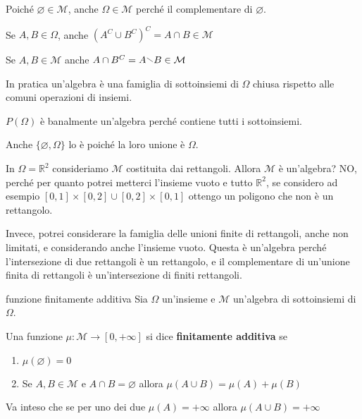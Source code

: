 \begin{remark}
    Poiché \(\varnothing \in \mathcal{M}\), anche \(\Omega \in \mathcal{M}\)
    perché il complementare di \(\varnothing\).
\end{remark}

\begin{remark}
Se \(A, B \in \Omega\), anche \({(A^{C} \cup B^{C})}^{C} = A \cap B \in
\mathcal{M}\) 
\end{remark}

\begin{remark}
    Se \(A, B \in \mathcal{M}\) anche \(A \cap B^{C} = A
    \sminus B \in
    \mathcal{M}\) 
\end{remark}

In pratica un'algebra è una famiglia di sottoinsiemi di \(\Omega\) chiusa
rispetto alle comuni operazioni di insiemi.

\begin{example}
    \(P(\Omega)\) è banalmente un'algebra perché contiene tutti i sottoinsiemi.

    Anche \(\{\varnothing, \Omega\}\) lo è poiché la loro unione è \(\Omega\).
\end{example}

\begin{example}
    In \(\Omega = \mathbb{R}^2\) consideriamo \(\mathcal{M}\) costituita dai
    rettangoli. Allora \(\mathcal{M}\) è un'algebra? NO, perché per quanto
    potrei metterci l'insieme vuoto e tutto \(\mathbb{R}^2\), se considero ad
    esempio \([0, 1] \times [0, 2] \cup [0, 2] \times [0, 1]\) ottengo un
    poligono che non è un rettangolo.

    Invece, potrei considerare la famiglia delle unioni finite di rettangoli,
    anche non limitati, e considerando anche l'insieme vuoto.
    Questa è un'algebra perché l'intersezione di due rettangoli è un rettangolo,
    e il complementare di un'unione finita di rettangoli è un'intersezione di
    finiti rettangoli.
\end{example}

\begin{definition}{funzione finitamente additiva}
     Sia \(\Omega\) un'insieme e \(\mathcal{M}\) un'algebra di sottoinsiemi di
     \(\Omega\).

     Una funzione \(\mu : \mathcal{M} \to [0, +\infty]\) si dice
     \textbf{finitamente additiva} se
\begin{enumerate}[label = \arabic*.]
    \item \(\mu(\varnothing) = 0\) 
    \item Se \(A, B \in \mathcal{M}\) e \(A \cap B = \varnothing\) allora
        \(\mu(A \cup B) = \mu(A) + \mu(B)\) 
\end{enumerate}
Va inteso che se per uno dei due \(\mu(A) = +\infty\) allora
\(\mu(A \cup B) = +\infty\) 
\end{definition}

